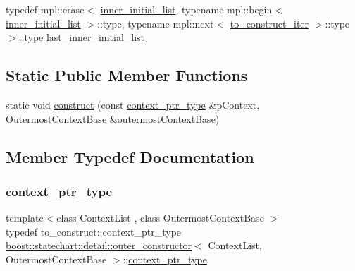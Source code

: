 \begin{DoxyCompactItemize}
\item 
typedef mpl\+::erase$<$ \mbox{\hyperlink{structboost_1_1statechart_1_1detail_1_1outer__constructor_a4c1c7fd76b5d06da5ebc2dc2c99444f9}{inner\+\_\+initial\+\_\+list}}, typename mpl\+::begin$<$ \mbox{\hyperlink{structboost_1_1statechart_1_1detail_1_1outer__constructor_a4c1c7fd76b5d06da5ebc2dc2c99444f9}{inner\+\_\+initial\+\_\+list}} $>$\+::type, typename mpl\+::next$<$ \mbox{\hyperlink{structboost_1_1statechart_1_1detail_1_1outer__constructor_a90925740f3c0336f09a152967a7e7173}{to\+\_\+construct\+\_\+iter}} $>$\+::type $>$\+::type \mbox{\hyperlink{structboost_1_1statechart_1_1detail_1_1outer__constructor_aef3673c2c30adab76dab9a8431f476e4}{last\+\_\+inner\+\_\+initial\+\_\+list}}
\end{DoxyCompactItemize}
\subsection*{Static Public Member Functions}
\begin{DoxyCompactItemize}
\item 
static void \mbox{\hyperlink{structboost_1_1statechart_1_1detail_1_1outer__constructor_af8c372517cf7586651a01bdd9e7fa15b}{construct}} (const \mbox{\hyperlink{structboost_1_1statechart_1_1detail_1_1outer__constructor_a2cfbd893ac80c92ac2e6ba1149851266}{context\+\_\+ptr\+\_\+type}} \&p\+Context, Outermost\+Context\+Base \&outermost\+Context\+Base)
\end{DoxyCompactItemize}


\subsection{Member Typedef Documentation}
\mbox{\label{structboost_1_1statechart_1_1detail_1_1outer__constructor_a2cfbd893ac80c92ac2e6ba1149851266}} 
\subsubsection{\texorpdfstring{context\+\_\+ptr\+\_\+type}{context\_ptr\_type}}
{\footnotesize\ttfamily template$<$class Context\+List , class Outermost\+Context\+Base $>$ \\
typedef to\+\_\+construct\+::context\+\_\+ptr\+\_\+type \mbox{\hyperlink{structboost_1_1statechart_1_1detail_1_1outer__constructor}{boost\+::statechart\+::detail\+::outer\+\_\+constructor}}$<$ Context\+List, Outermost\+Context\+Base $>$\+::\mbox{\hyperlink{structboost_1_1statechart_1_1detail_1_1outer__constructor_a2cfbd893ac80c92ac2e6ba1149851266}{context\+\_\+ptr\+\_\+type}}}

